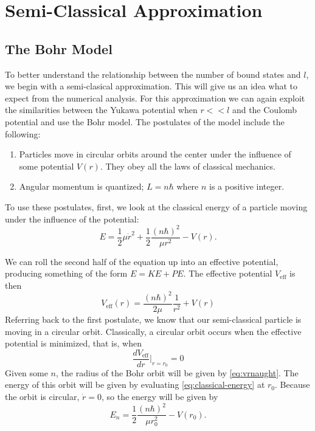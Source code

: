 \documentclass[12pt,twoside]{reedthesis}
\newcommand{\eqn}[1]{\begin{equation}#1\end{equation}}
\begin{document}
\clearpage %

\chapter{Semi-Classical Approximation}
\section{The Bohr Model}
To better understand the relationship between the number of bound states and $l$, we begin with a semi-clasical approximation. This will give us an idea what to expect from the numerical analysis. For this approximation we can again exploit the similarities between the Yukawa potential when $r << l$ and the Coulomb potential and use the Bohr model. 
The postulates of the model include the following:
\begin{enumerate}
\item Particles move in circular orbits around the center under the influence of some potential $V(r)$. They obey all the laws of classical mechanics.
\item Angular momentum is quantized; $L = n\hbar$ where $n$ is a positive integer.
\end{enumerate}

To use these postulates, first, we look at the classical energy of a particle moving under the influence of the potential:
\eqn{
E = \frac{1}{2}\mu \dot{r}^2+\frac{1}{2}\frac{(n \hbar)^2}{\mu r^2}-V(r)\mbox{.}
\label{eq:classical-energy}
}

We can roll the second half of the equation up into an effective potential, producing something of the form $E = KE + PE$. The effective potential $V_{\mathrm{eff}}$ is then
\eqn{
V_{\mathrm{eff}}(r)=\frac{(n \hbar)^2}{2 \mu}\frac{1}{r^2}+V(r)
\label{eq:veff}
}
Referring back to the first postulate, we know that our semi-classical particle is moving in a circular orbit. Classically, a circular orbit occurs when the effective potential is minimized, that is, when
\eqn{
\frac{dV_{\mathrm{eff}}}{d r}\Big |_{r = r_0}= 0
\label{eq:vrnaught}
}
Given some $n$, the radius of the Bohr orbit will be given by \eqref{eq:vrnaught}. The energy of this orbit will be given by evaluating \eqref{eq:classical-energy}
 at $r_0$. Because the orbit is circular, $\dot{r} = 0$, so the energy will be given by
\eqn{
E_{n} = \frac{1}{2}\frac{(n\hbar)^2}{\mu r_0^2} - V(r_0)\mbox{.}
}
\end{document}
